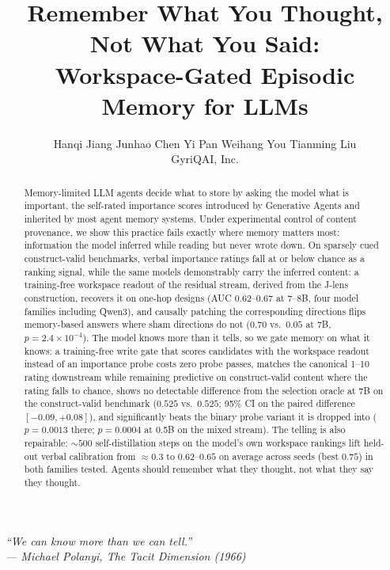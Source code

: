 \documentclass{article}
\title{Remember What You Thought, Not What You Said:\\
Workspace-Gated Episodic Memory for LLMs}
\author{Hanqi Jiang \quad Junhao Chen \quad Yi Pan \quad Weihang You \quad Tianming Liu\\
\small GyriQAI, Inc.}
\date{}
\begin{document}
\maketitle

\begin{center}
\itshape ``We can know more than we can tell.''\\[2pt]
{\upshape --- Michael Polanyi, \emph{The Tacit Dimension} (1966)}
\end{center}
\vspace{4pt}

\begin{abstract}
Memory-limited LLM agents decide what to store by asking the model what is
important, the self-rated importance scores introduced by Generative Agents
and inherited by most agent memory systems. Under experimental control of
content provenance, we show this practice fails exactly where memory matters
most: information the model inferred while reading but never wrote down. On
sparsely cued construct-valid benchmarks, verbal importance ratings fall at
or below chance as a ranking signal, while the same models demonstrably
carry the inferred content: a training-free workspace readout of the residual
stream, derived from the J-lens construction, recovers it on one-hop designs
(AUC $0.62$--$0.67$ at 7--8B, four model families including Qwen3), and causally patching the
corresponding directions flips memory-based answers where sham directions do
not ($0.70$ vs.\ $0.05$ at 7B, $p{=}2.4\times10^{-4}$). The model knows
more than it tells, so we gate memory on what it knows: a training-free
write gate that scores candidates with the workspace readout instead of an
importance probe costs zero probe passes, matches the canonical 1--10 rating
downstream while remaining predictive on construct-valid content where the
rating falls to chance, shows no detectable difference from the selection
oracle at 7B on the construct-valid benchmark ($0.525$ vs.\ $0.525$; 95\%
CI on the paired difference $[-0.09, +0.08]$), and significantly beats the
binary probe variant it is dropped into ($p{=}0.0013$ there;
$p{=}0.0004$ at 0.5B on the mixed stream). The telling is also repairable:
${\sim}500$ self-distillation steps on the model's own workspace rankings
lift held-out verbal calibration from ${\approx}0.3$ to $0.62$--$0.65$ on
average across seeds (best $0.75$) in both families tested. Agents
should remember what they thought, not what they say they thought.
\end{abstract}












\clearpage
\appendix

\end{document}
